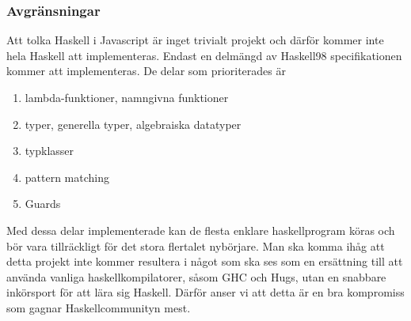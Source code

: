 \subsubsection{Avgränsningar}
Att tolka Haskell i Javascript är inget trivialt projekt och därför kommer inte hela Haskell att implementeras. 
Endast en delmängd av Haskell98 specifikationen kommer att implementeras. De delar som prioriterades är
        \begin{enumerate}
            \item{lambda-funktioner, namngivna funktioner}
            \item{typer, generella typer, algebraiska datatyper}
            \item{typklasser}
            \item{pattern matching}
            \item{Guards}
            \end{enumerate}
Med dessa delar implementerade kan de flesta enklare haskellprogram köras och bör vara tillräckligt för det stora flertalet nybörjare. Man ska komma ihåg att detta projekt inte kommer resultera i något som ska ses som en ersättning till att använda vanliga haskellkompilatorer, såsom GHC och Hugs, utan en snabbare inkörsport för att lära sig Haskell. Därför anser vi att detta är en bra kompromiss som gagnar Haskellcommunityn mest. %

